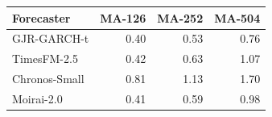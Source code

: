 \begin{tabular}{lrrr}
\toprule
Forecaster & MA-126 & MA-252 & MA-504 \\
\midrule
  GJR-GARCH-t & 0.40 & 0.53 & 0.76 \\
  TimesFM-2.5 & 0.42 & 0.63 & 1.07 \\
  Chronos-Small & 0.81 & 1.13 & 1.70 \\
  Moirai-2.0 & 0.41 & 0.59 & 0.98 \\
\bottomrule
\end{tabular}

